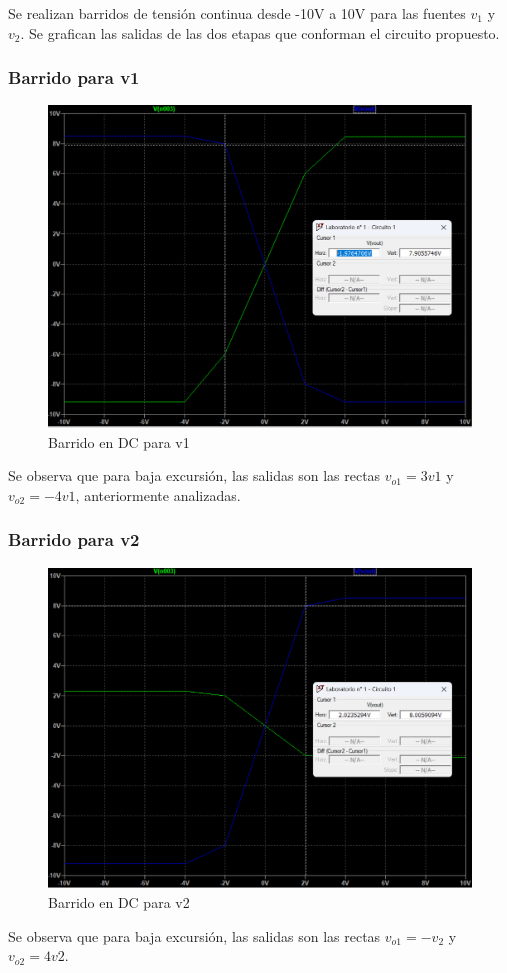 Se realizan barridos de tensión continua desde -10V a 10V para las fuentes \(v_1\) y \(v_2\). Se grafican las salidas de las dos etapas que conforman el circuito propuesto.

\subsubsection{Barrido para v1}

\begin{figure}[h!]
    \centering
    \includegraphics[width=0.7\linewidth]{Secciones/Circuito1/Barrido1.png}
    
    \caption{Barrido en DC para v1}
\end{figure}

Se observa que para baja excursión, las salidas son las rectas \(v_{o1}= 3v1\) y \(v_{o2}= -4v1\), anteriormente analizadas.

\subsubsection{Barrido para v2}
\begin{figure}[h!]
    \centering
    \includegraphics[width=0.7\linewidth]{Secciones/Circuito1/Barrido2.png}
    
    \caption{Barrido en DC para v2}
\end{figure}
Se observa que para baja excursión, las salidas son las rectas \(v_{o1}= -v_2\)  y \(v_{o2}= 4v2\).

